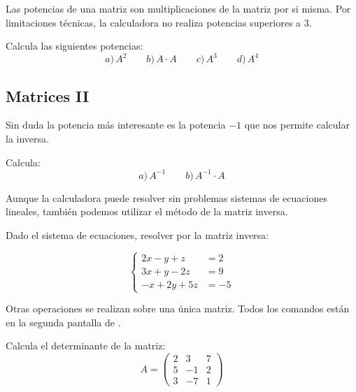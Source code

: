 \documentclass[12pt]{article}
\newcommand{\casiosymbol}[1]{{\footnotesize\casio\symbol{#1}}}
\newenvironment{capitulo}{\begin{tcolorbox}[colback=blue!5!white,colframe=red!75!black]}{\end{tcolorbox}\bigskip}
\newenvironment{ejer}{\begin{tcolorbox}[center title, 
fonttitle=\sffamily\bfseries,colback=blue!5,colframe=orange]}{\end{tcolorbox}}
\begin{document}
Las potencias de una matriz son multiplicaciones de la matriz por si misma. Por limitaciones técnicas,  la calculadora no realiza potencias superiores a 3.

\begin{ejer} 

Calcula las siguientes potencias:
\[
a)\, A^2 \qquad  b)\, A \cdot A\qquad  c)\, A^3 \qquad  d)\, A^4 
\]

\end{ejer}


\newpage

\begin{capitulo}
\section*{Matrices II}
\end{capitulo}

Sin duda la potencia más interesante es la potencia $-1$ que nos permite calcular la inversa.

\begin{ejer}

Calcula:
\[
a)\, A^{-1} \qquad b)\, A^{-1} \cdot A
\]

\end{ejer}

Aunque la calculadora puede resolver sin problemas sistemas de ecuaciones lineales, también podemos utilizar el método de la matriz inversa.

\begin{ejer}

Dado el sistema de ecuaciones, resolver por la matriz inversa:

\[
\begin{cases}
2x-y+z &= 2\\
3x+y-2z & = 9\\
-x+2y+5z& = -5
\end{cases}
\]


\end{ejer}

Otras operaciones se realizan sobre una única matriz. Todos los comandos están en la segunda pantalla  de \casiosymbol{84}.


\begin{ejer}

Calcula el determinante de la matriz:
\[
A=\begin{pmatrix}
2 & 3 & 7\\
5 & -1 & 2 \\
3 & -7 & 1
\end{pmatrix}
\]

\end{ejer}
\end{document}
